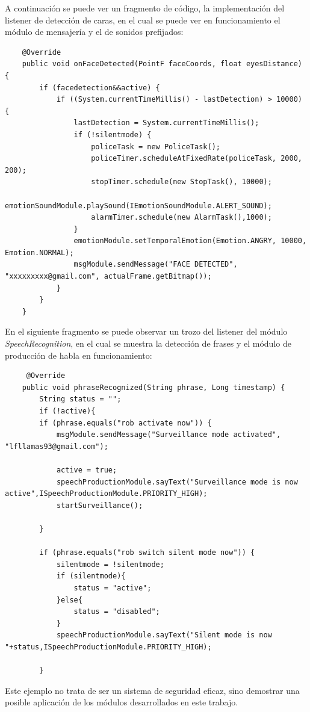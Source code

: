 A continuación se puede ver un fragmento de código, la implementación del listener de detección de caras, en el cual se puede ver en funcionamiento el módulo de mensajería y el de sonidos prefijados:
\begin{lstlisting}
    @Override
    public void onFaceDetected(PointF faceCoords, float eyesDistance) {
        if (facedetection&&active) {
            if ((System.currentTimeMillis() - lastDetection) > 10000) {
                lastDetection = System.currentTimeMillis();
                if (!silentmode) {
                    policeTask = new PoliceTask();
                    policeTimer.scheduleAtFixedRate(policeTask, 2000, 200);
                    stopTimer.schedule(new StopTask(), 10000);
                    emotionSoundModule.playSound(IEmotionSoundModule.ALERT_SOUND);
                    alarmTimer.schedule(new AlarmTask(),1000);
                }
                emotionModule.setTemporalEmotion(Emotion.ANGRY, 10000, Emotion.NORMAL);
                msgModule.sendMessage("FACE DETECTED", "xxxxxxxxx@gmail.com", actualFrame.getBitmap());
            }
        }
    }
\end{lstlisting}
En el siguiente fragmento se puede observar un trozo del listener del módulo \textit{SpeechRecognition}, en el cual se muestra la detección de frases y el módulo de producción de habla en funcionamiento:
\begin{lstlisting}
	 @Override
    public void phraseRecognized(String phrase, Long timestamp) {
        String status = "";
        if (!active){
        if (phrase.equals("rob activate now")) {
            msgModule.sendMessage("Surveillance mode activated", "lfllamas93@gmail.com");

            active = true;
            speechProductionModule.sayText("Surveillance mode is now active",ISpeechProductionModule.PRIORITY_HIGH);
            startSurveillance();

        }

        if (phrase.equals("rob switch silent mode now")) {
            silentmode = !silentmode;
            if (silentmode){
                status = "active";
            }else{
                status = "disabled";
            }
            speechProductionModule.sayText("Silent mode is now "+status,ISpeechProductionModule.PRIORITY_HIGH);

        }
\end{lstlisting}


Este ejemplo no trata de ser un sistema de seguridad eficaz, sino demostrar una posible aplicación de los módulos desarrollados en este trabajo.

